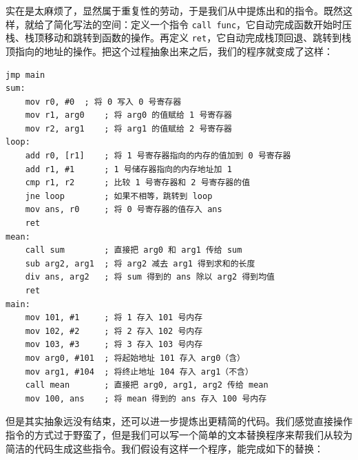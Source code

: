 实在是太麻烦了，显然属于重复性的劳动，于是我们从中提炼出和的指令。既然这样，就给了简化写法的空间：定义一个指令 \texttt{call func}，它自动完成函数开始时压栈、栈顶移动和跳转到函数的操作。再定义 \texttt{ret}，它自动完成栈顶回退、跳转到栈顶指向的地址的操作。把这个过程抽象出来之后，我们的程序就变成了这样：
\begin{verbatim}
jmp main
sum:
    mov r0, #0  ; 将 0 写入 0 号寄存器
    mov r1, arg0    ; 将 arg0 的值赋给 1 号寄存器
    mov r2, arg1    ; 将 arg1 的值赋给 2 号寄存器
loop:
    add r0, [r1]    ; 将 1 号寄存器指向的内存的值加到 0 号寄存器
    add r1, #1      ; 1 号储存器指向的内存地址加 1
    cmp r1, r2      ; 比较 1 号寄存器和 2 号寄存器的值
    jne loop        ; 如果不相等，跳转到 loop
    mov ans, r0     ; 将 0 号寄存器的值存入 ans
    ret
mean:
    call sum        ; 直接把 arg0 和 arg1 传给 sum
    sub arg2, arg1  ; 将 arg2 减去 arg1 得到求和的长度
    div ans, arg2   ; 将 sum 得到的 ans 除以 arg2 得到均值
    ret
main:
    mov 101, #1     ; 将 1 存入 101 号内存
    mov 102, #2     ; 将 2 存入 102 号内存
    mov 103, #3     ; 将 3 存入 103 号内存
    mov arg0, #101  ; 将起始地址 101 存入 arg0（含）
    mov arg1, #104  ; 将终止地址 104 存入 arg1（不含）
    call mean       ; 直接把 arg0, arg1, arg2 传给 mean
    mov 100, ans    ; 将 mean 得到的 ans 存入 100 号内存
\end{verbatim}

但是其实抽象远没有结束，还可以进一步提炼出更精简的代码。我们感觉直接操作指令的方式过于野蛮了，但是我们可以写一个简单的文本替换程序来帮我们从较为简洁的代码生成这些指令。我们假设有这样一个程序，能完成如下的替换：

